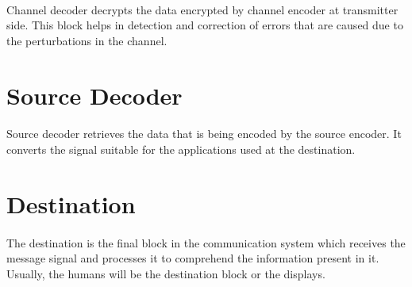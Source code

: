 \documentclass[14pt]{report}
\begin{document}
{\paragraph{} Channel decoder decrypts the data encrypted by channel encoder at transmitter side. This block helps in detection and correction of errors that are caused due to the perturbations in the channel. 
\section{Source Decoder}
\paragraph{} Source decoder retrieves the data that is being encoded by the source encoder. It converts the signal suitable for the applications used at the destination.
\section{Destination}
\paragraph{} The destination is the final block in the communication system which receives the message signal and processes it to comprehend the information present in it. Usually, the humans will be the destination block or the displays.
}
\end{document}
